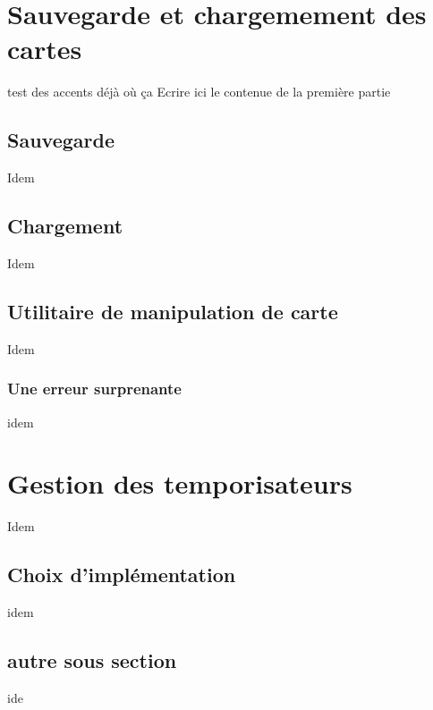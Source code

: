 \documentclass[10pt,a4paper]{article} %
\begin{document}
    \title{\rmfamily\normalfont{}}
    \author{}
    \date{\today} %
    
    \maketitle

    \begin{abstract}
      ici on fait l'introduction / résumé du projet
    \end {abstract}
    
    \tableofcontents
    
    \section{Sauvegarde et chargemement des cartes}

    test des accents déjà où ça
    Ecrire ici le contenue de la première partie
    \subsection{Sauvegarde}
    Idem
    
    \subsection{Chargement}
    Idem
    
    \subsection{Utilitaire de manipulation de carte}
    Idem
    \subsubsection{Une erreur surprenante}
    idem
    
    \section{Gestion des temporisateurs}
    Idem
    
    \subsection{Choix d'implémentation}
    idem

    \subsection{autre sous section}
    ide
    
\end{document}
